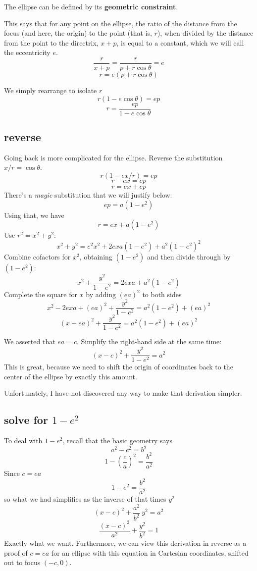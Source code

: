 \documentclass[11pt, oneside]{article}
\begin{document}
The ellipse can be defined by its \textbf{geometric constraint}.

This says that for any point on the ellipse, the ratio of the distance from the focus (and here, the origin) to the point (that is, $r$), when divided by the distance from the point to the directrix, $x + p$, is equal to a constant, which we will call the eccentricity $e$.
\[ \frac{r}{x + p} = \frac{r}{p + r \cos \theta} = e \]
\[ r = e(p + r \cos \theta) \]

We simply rearrange to isolate $r$
\[ r(1 - e \cos \theta) = ep \]
\[ r = \frac{ep}{1 - e \cos \theta} \]

\subsection*{reverse}
Going back is more complicated for the ellipse. Reverse the substitution $x/r = \cos \theta$.
\[ r(1 - e x/r) = ep \]
\[ r - ex = ep \]
\[ r = ex + ep \]
There's a \emph{magic} substitution that we will justify below: 
\[ ep = a(1 - e^2) \]
Using that, we have
\[ r = ex + a(1-e^2) \]
Use $r^2 = x^2 + y^2$:
\[ x^2 + y^2 = e^2 x^2 + 2exa(1-e^2) + a^2(1- e^2)^2 \]
Combine cofactors for $x^2$, obtaining $(1-e^2)$ and then divide through by $(1-e^2)$: 
\[ x^2 + \frac{y^2}{1-e^2} = 2exa + a^2(1- e^2) \]
Complete the square for $x$ by adding $(ea)^2$ to both sides
\[ x^2 - 2exa + (ea)^2 + \frac{y^2}{1-e^2} = a^2(1- e^2) + (ea)^2 \]
\[ (x - ea)^2 + \frac{y^2}{1-e^2} = a^2(1- e^2) + (ea)^2 \]

We asserted that $ea = c$.  Simplify the right-hand side at the same time:
\[ (x - c)^2 + \frac{y^2}{1-e^2} = a^2 \]
This is great, because we need to shift the origin of coordinates back to the center of the ellipse by exactly this amount.

Unfortunately, I have not discovered any way to make that derivation simpler.  
\subsection*{solve for $1 - e^2$}

To deal with $1 - e^2$, recall that the basic geometry says
\[ a^2 - c^2 = b^2 \]
\[ 1 - (\frac{c}{a})^2 = \frac{b^2}{a^2} \]
Since $c = ea$
\[ 1 - e^2 = \frac{b^2}{a^2}  \]
so what we had simplifies as the inverse of that times $y^2$
\[ (x - c)^2 + \frac{a^2}{b^2} \ y^2 = a^2 \]
\[ \frac{(x - c)^2}{a^2} + \frac{y^2}{b^2} = 1 \]
Exactly what we want.  Furthermore, we can view this derivation in reverse as a proof of $c = ea$ for an ellipse with this equation in Cartesian coordinates, shifted out to focus $(-c,0)$.
\end{document}
